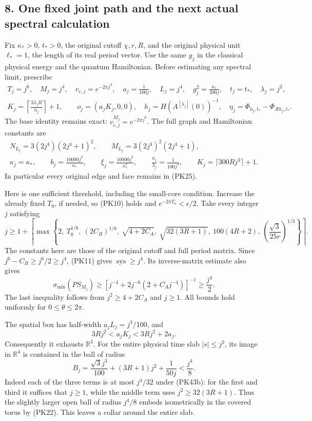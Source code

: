 \documentclass[11pt]{article}
\begin{document}
\subsection*{8. One fixed joint path and the next actual spectral calculation}

Fix \(\kappa_*>0\), \(t_*>0\), the original cutoff \(\chi,r,R\), and
the original physical unit \(\ell_*=1\), the length of its real period
vector. Use the same \(g_j\) in the classical physical energy and the
quantum Hamiltonian. Before estimating any spectral limit, prescribe
\[
 \begin{gathered}
 T_j=j^6,\quad M_j=j^4,\quad v_{c,j}=e^{-2\pi j^2},\quad
 a_j=\frac1{100j},\quad L_j=j^4,\quad
 g_j^2=\frac{\kappa_*}{200j},\quad t_j=t_*,\quad \lambda_j=j^2,\\
 K_j=\left\lceil\frac{3\lambda_jR}{a_j}\right\rceil+1,\qquad
 o_j=(a_jK_j,0,0),\quad h_j=H(A^{[\lambda_j]}(0))^{-1},
 \quad \eta_j=\Phi_{h_j,t_*}-\Phi_{\mathcal Rh_j,t_*}.
 \end{gathered}\tag{PK43}
\]
The base identity remains exact:
\(v_{c,j}^{M_j}=e^{-2\pi j^6}\). The full graph and Hamiltonian constants are
\[
 \begin{gathered}
 N_{L_j}=3(2j^4)(2j^4+1)^2,\qquad
 M_{L_j}=3(2j^4)^2(2j^4+1),\\
 \kappa_j=\kappa_*,\qquad b_j=\frac{10000j^2}{\kappa_*},\qquad
 \xi_j=\frac{10000j^2}{\kappa_*^2},\qquad
 \frac{a_j}{\lambda_j}=\frac1{100j^3},\qquad
 K_j=\lceil300Rj^3\rceil+1 .
 \end{gathered}\tag{PK43a}
\]
In particular every original edge and face remains in (PK25).

Here is one sufficient threshold, including the small-core condition.
Increase the already fixed \(T_0\), if needed, so (PK10) holds and
\(e^{-2\pi T_0}<\epsilon/2\). Take every integer \(j\) satisfying
\[
 j\ge 1+\left\lceil\max\left\{
 2,\ T_0^{1/6},\ (2C_B)^{1/6},\
 \sqrt{4+2C_A},\ \sqrt{32(3R+1)},\
 100(4R+2),\ \left(\frac{\sqrt3}{25r}\right)^{1/3}
 \right\}\right\rceil.
 \tag{PK43b}
\]
The constants here are those of the original cutoff and full period matrix.
Since \(j^6-C_B\ge j^6/2\ge j^4\), (PK11) gives
\(\operatorname{sys}\ge j^4\). Its inverse-matrix estimate also gives
\[
 \sigma_{\min}(PS_{M_j})
 \ge\left[j^{-4}+2j^{-6}(2+C_Aj^{-4})\right]^{-1}
 \ge \frac{j^4}{2}.
 \tag{PK43c}
\]
The last inequality follows from \(j^2\ge4+2C_A\) and \(j\ge1\).
All bounds hold uniformly for \(0\le\theta\le2\pi\).

The spatial box has half-width \(a_jL_j=j^3/100\), and
\[
 3Rj^2<a_jK_j<3Rj^2+2a_j.
\]
Consequently it exhausts \(\mathbb R^3\). For the entire physical time
slab \(|s|\le j^2\), its image in \(\mathbb R^4\) is contained in the ball
of radius
\[
 B_j=\frac{\sqrt3j^3}{100}+(3R+1)j^2+\frac1{50j}
 <\frac{j^4}{8}.
 \tag{PK43d}
\]
Indeed each of the three terms is at most \(j^4/32\) under (PK43b):
for the first and third it suffices that \(j\ge1\), while the middle
term uses \(j^2\ge32(3R+1)\). Thus the slightly larger open ball of
radius \(j^4/8\) embeds isometrically in the covered torus by (PK22).
This leaves a collar around the entire slab.
\end{document}

